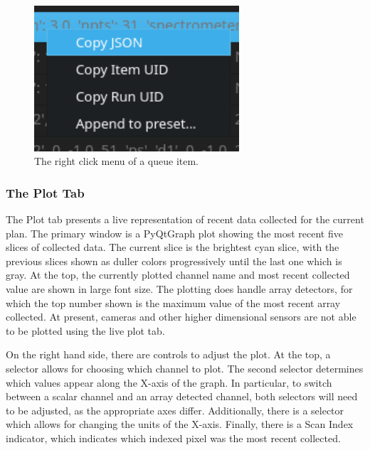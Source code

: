 \begin{figure}
\includegraphics[width=3in]{"acquisition/images/right_click_menu"}
\caption[Right click menu]{
	The right click menu of a queue item.
}
\label{acq:fig:right_click}
\end{figure}

\subsubsection{The Plot Tab}

The Plot tab presents a live representation of recent data collected for the current plan.
The primary window is a PyQtGraph\cite{} plot showing the most recent five slices of collected data.
The current slice is the brightest cyan slice, with the previous slices shown as duller colors progressively until the last one which is gray.
At the top, the currently plotted channel name and most recent collected value are shown in large font size.
The plotting does handle array detectors, for which the top number shown is the maximum value of the most recent array collected.
At present, cameras and other higher dimensional sensors are not able to be plotted using the live plot tab.

On the right hand side, there are controls to adjust the plot.
At the top, a selector allows for choosing which channel to plot.
The second selector determines which values appear along the X-axis of the graph.
In particular, to switch between a scalar channel and an array detected channel, both selectors will need to be adjusted, as the appropriate axes differ.
Additionally, there is a selector which allows for changing the units of the X-axis.
Finally, there is a Scan Index indicator, which indicates which indexed pixel was the most recent collected.

